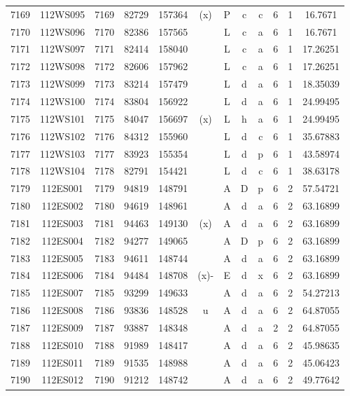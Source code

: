 \begin{tabular}{|*{12}{c|}}
7169 & 112WS095 & 7169 & 82729 & 157364 & (x) & P & c & c & 6 & 1 & 16.7671 \\ 
7170 & 112WS096 & 7170 & 82386 & 157565 &  & L & c & a & 6 & 1 & 16.7671 \\ 
7171 & 112WS097 & 7171 & 82414 & 158040 &  & L & c & a & 6 & 1 & 17.26251 \\ 
7172 & 112WS098 & 7172 & 82606 & 157962 &  & L & c & a & 6 & 1 & 17.26251 \\ 
7173 & 112WS099 & 7173 & 83214 & 157479 &  & L & d & a & 6 & 1 & 18.35039 \\ 
7174 & 112WS100 & 7174 & 83804 & 156922 &  & L & d & a & 6 & 1 & 24.99495 \\ 
7175 & 112WS101 & 7175 & 84047 & 156697 & (x) & L & h & a & 6 & 1 & 24.99495 \\ 
7176 & 112WS102 & 7176 & 84312 & 155960 &  & L & d & c & 6 & 1 & 35.67883 \\ 
7177 & 112WS103 & 7177 & 83923 & 155354 &  & L & d & p & 6 & 1 & 43.58974 \\ 
7178 & 112WS104 & 7178 & 82791 & 154421 &  & L & d & c & 6 & 1 & 38.63178 \\ 
7179 & 112ES001 & 7179 & 94819 & 148791 &  & A & D & p & 6 & 2 & 57.54721 \\ 
7180 & 112ES002 & 7180 & 94619 & 148961 &  & A & d & a & 6 & 2 & 63.16899 \\ 
7181 & 112ES003 & 7181 & 94463 & 149130 & (x) & A & d & a & 6 & 2 & 63.16899 \\ 
7182 & 112ES004 & 7182 & 94277 & 149065 &  & A & D & p & 6 & 2 & 63.16899 \\ 
7183 & 112ES005 & 7183 & 94611 & 148744 &  & A & d & a & 6 & 2 & 63.16899 \\ 
7184 & 112ES006 & 7184 & 94484 & 148708 & (x)- & E & d & x & 6 & 2 & 63.16899 \\ 
7185 & 112ES007 & 7185 & 93299 & 149633 &  & A & d & a & 6 & 2 & 54.27213 \\ 
7186 & 112ES008 & 7186 & 93836 & 148528 & u & A & d & a & 6 & 2 & 64.87055 \\ 
7187 & 112ES009 & 7187 & 93887 & 148348 &  & A & d & a & 2 & 2 & 64.87055 \\ 
7188 & 112ES010 & 7188 & 91989 & 148417 &  & A & d & a & 6 & 2 & 45.98635 \\ 
7189 & 112ES011 & 7189 & 91535 & 148988 &  & A & d & a & 6 & 2 & 45.06423 \\ 
7190 & 112ES012 & 7190 & 91212 & 148742 &  & A & d & a & 6 & 2 & 49.77642 \\ 

\end{tabular}
